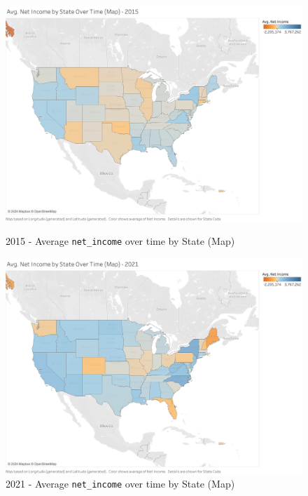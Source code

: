 \documentclass{article}
\theoremstyle{mytheoremstyle}
\theoremstyle{mytheoremstyle}
\theoremstyle{myproblemstyle}
\begin{document}
\pagebreak
\begin{figure}[!h]
\centering
\begin{minipage}{\linewidth}
    \centering %
    \includegraphics[width=0.75\linewidth]{Images/Avg. Net Income by State Over Time (Map).png}
    \caption{2015 - Average \texttt{net\_income} over time by State (Map)}
    \label{fig:net_income_map}
\end{minipage}\vspace{1cm} %

\begin{minipage}{\linewidth}
    \centering %
    \includegraphics[width=0.75\linewidth]{Images/Avg. Net Income by State Over Time (Map)2021.png}
    \caption{2021 - Average \texttt{net\_income} over time by State (Map)}
    \label{fig:net_income_map_2021}
\end{minipage}
\end{figure}

\pagebreak
\end{document}
